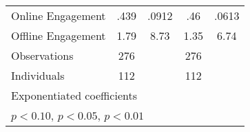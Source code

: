 \begin{table}[htbp]
\begin{tabular}{l*{4}{c}}
\hspace{0.25cm} Online Engagement&      .439        &     .0912\sym{*} &       .46        &     .0613\sym{**}\\
\hspace{0.25cm} Offline Engagement&      1.79        &      8.73\sym{^+}&      1.35        &      6.74\sym{*} \\
\midrule
Observations                  &       276        &                  &       276        &                  \\
Individuals                   &       112        &                  &       112        &                  \\
\bottomrule
\multicolumn{5}{l}{\footnotesize Exponentiated coefficients}\\
\multicolumn{5}{l}{\footnotesize \sym{^+} \(p<0.10\), \sym{*} \(p<0.05\), \sym{**} \(p<0.01\)}\\
\end{tabular}
\end{table}
